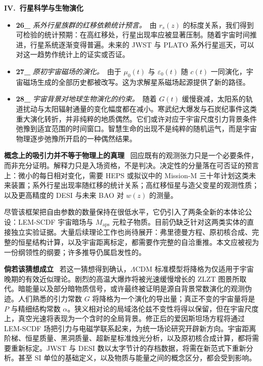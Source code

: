 \documentclass[12pt,leqno]{article}
\begin{document}
		
	\medskip
	\bigskip
	\textbf{IV.\ 行星科学与生物演化}
	\begin{itemize}
		\item \textbf{26\_} \textit{系外行星族群的红移依赖统计预言。}\,\,\,由 $r_s(z)$ 的标度关系，我们得到可检验的统计预期：在高红移处，行星出现率应被显著压制。随着宇宙时间推进，行星系统逐渐变得普遍。未来的 JWST 与 PLATO 系外行星巡天，可以对这一趋势作统计上的证实或否证。
		
		\item \textbf{27\_} \textit{原初宇宙磁场的演化。}\,\,\,由于 $\mu_0(t)$ 与 $\varepsilon_0(t)$ 随 $c(t)$ 一同演化，宇宙磁场生成的全部历史都被改写。这为求解星系磁场起源提供了新的路径。
		
		\item \textbf{28\_} \textit{宇宙背景对地球生物演化的约束。}\,\,\,随着 $G(t)$ 缓慢衰减，太阳系的轨道扰动与太阳辐射通量的变化幅度都在减小。寒武纪大爆发与石炭纪事件这类重大演化转折，并非纯粹的地质偶然。它们或许对应于宇宙尺度引力背景条件弛豫到适宜范围的时间窗口。智慧生命的出现不是纯粹的随机运气，而是宇宙物理逐步弛豫所开启的一种偶然结果。
	\end{itemize}
	
	
	\bigskip
	\textbf{概念上的吸引力并不等于物理上的真理}\,\,\,
	回应既有的观测张力只是一个必要条件，而非充分证明。解释力只是入场资格，不是判决。决定性的分量落在可否证的预言上：微小的每日相对变化，需要 HEPS 或拟议中的 Mission-M 三十年计划这类未来装置；系外行星出现率随红移的统计关系；高红移恒星与造父变星的观测性质；以及更高精度的 DESI 与未来 BAO 对 $w(z)$ 的测量。
	
	\medskip
	尽管该框架把自由参数的数量保持在很低水平，它仍引入了两条全新的本体论公设：LEM-SCDF 宇宙暗场与 $M_\mathrm{aps}$ 元粒子物质。目前仍缺乏针对这两类实体的直接独立实验证据。大量后续理论工作也尚待展开：弗里德曼方程、原初核合成、完整的恒星结构计算，以及宇宙距离标定，都需要作完整的自洽重推。本文应被视为一份纲领性的纲要；许多推导仍属启发性的。
		
	\bigskip
	\textbf{倘若该猜想成立}\,\,\,	
	若这一猜想得到确认，$\Lambda$CDM 标准模型将降格为仅适用于宇宙晚期的有效近似理论。剧烈的高温大爆炸将被光速缓慢增长的 ZLZT 图景所取代。暗能量以及部分暗物质信号，或许最终被证明是源自背景常数演化的观测伪迹。人们熟悉的引力常数 $G$ 将降格为一个演化的导出量；真正不变的宇宙量将是 $P$ 与精细结构常数 $\alpha$。狭义相对论的局域洛伦兹不变性将得以保留，但在宇宙尺度上，真空光速将表现为一个含时的全局背景。修正后的爱因斯坦场方程将通过 LEM-SCDF 场把引力与电磁学联系起来，为统一场论研究开辟新方向。宇宙距离阶梯、恒星质量、黑洞质量、超新星标准烛光分析，以及原初核合成计算，都将需要重新标定。JWST 与 DESI 数以太字节计的存档数据，将需在新范式下重新分析。甚至 SI 单位的基础定义，以及物质与能量之间的概念区分，都会受到影响。
	
\end{document}
